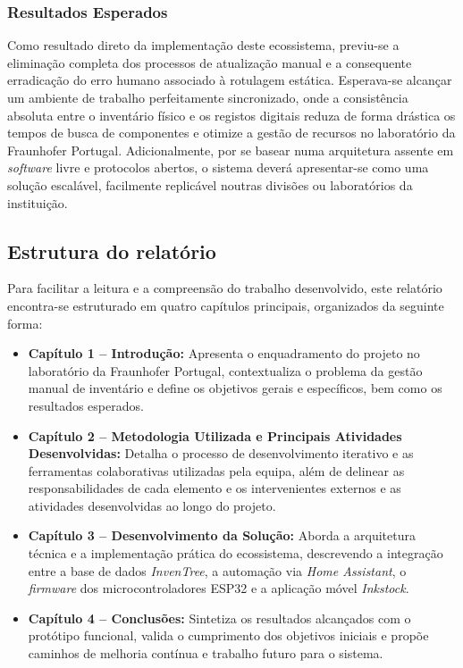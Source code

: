 \documentclass[10pt]{article}
\begin{document}
    \subsubsection{Resultados Esperados}
    Como resultado direto da implementação deste ecossistema, previu-se a eliminação completa dos processos de atualização manual e a consequente erradicação do erro humano associado à rotulagem estática. Esperava-se alcançar um ambiente de trabalho perfeitamente sincronizado, onde a consistência absoluta entre o inventário físico e os registos digitais reduza de forma drástica os tempos de busca de componentes e otimize a gestão de recursos no laboratório da Fraunhofer Portugal. Adicionalmente, por se basear numa arquitetura assente em \textit{software} livre e protocolos abertos, o sistema deverá apresentar-se como uma solução escalável, facilmente replicável noutras divisões ou laboratórios da instituição.
	
    
	\subsection{Estrutura do relatório}

    Para facilitar a leitura e a compreensão do trabalho desenvolvido, este relatório encontra-se estruturado em quatro capítulos principais, organizados da seguinte forma:
    \begin{itemize}
    \item \textbf{Capítulo 1 -- Introdução:} Apresenta o enquadramento do projeto no laboratório da Fraunhofer Portugal, contextualiza o problema da gestão manual de inventário e define os objetivos gerais e específicos, bem como os resultados esperados.
    \item \textbf{Capítulo 2 -- Metodologia Utilizada e Principais Atividades Desenvolvidas:} Detalha o processo de desenvolvimento iterativo e as ferramentas colaborativas utilizadas pela equipa, além de delinear as responsabilidades de cada elemento e os intervenientes externos e as atividades desenvolvidas ao longo do projeto.
    \item \textbf{Capítulo 3 -- Desenvolvimento da Solução:} Aborda a arquitetura técnica e a implementação prática do ecossistema, descrevendo a integração entre a base de dados \textit{InvenTree}, a automação via \textit{Home Assistant}, o \textit{firmware} dos microcontroladores ESP32 e a aplicação móvel \textit{Inkstock}.
    \item \textbf{Capítulo 4 -- Conclusões:} Sintetiza os resultados alcançados com o protótipo funcional, valida o cumprimento dos objetivos iniciais e propõe caminhos de melhoria contínua e trabalho futuro para o sistema.
\end{itemize}
\end{document}
